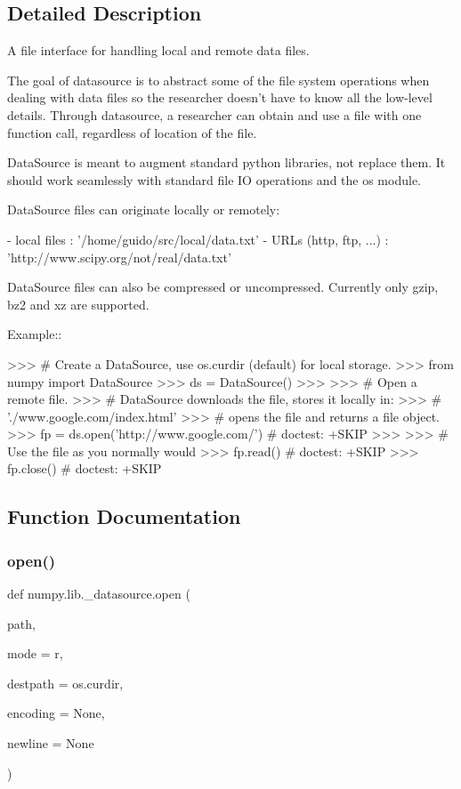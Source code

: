 \subsection{Detailed Description}
\begin{DoxyVerb}A file interface for handling local and remote data files.

The goal of datasource is to abstract some of the file system operations
when dealing with data files so the researcher doesn't have to know all the
low-level details.  Through datasource, a researcher can obtain and use a
file with one function call, regardless of location of the file.

DataSource is meant to augment standard python libraries, not replace them.
It should work seamlessly with standard file IO operations and the os
module.

DataSource files can originate locally or remotely:

- local files : '/home/guido/src/local/data.txt'
- URLs (http, ftp, ...) : 'http://www.scipy.org/not/real/data.txt'

DataSource files can also be compressed or uncompressed.  Currently only
gzip, bz2 and xz are supported.

Example::

    >>> # Create a DataSource, use os.curdir (default) for local storage.
    >>> from numpy import DataSource
    >>> ds = DataSource()
    >>>
    >>> # Open a remote file.
    >>> # DataSource downloads the file, stores it locally in:
    >>> #     './www.google.com/index.html'
    >>> # opens the file and returns a file object.
    >>> fp = ds.open('http://www.google.com/') # doctest: +SKIP
    >>>
    >>> # Use the file as you normally would
    >>> fp.read() # doctest: +SKIP
    >>> fp.close() # doctest: +SKIP\end{DoxyVerb}
 

\subsection{Function Documentation}
\mbox{\label{namespacenumpy_1_1lib_1_1__datasource_a31cb95875384c18d75b818588d65d980}} 
\subsubsection{\texorpdfstring{open()}{open()}}
{\footnotesize\ttfamily def numpy.\+lib.\+\_\+datasource.\+open (\begin{DoxyParamCaption}\item[{}]{path,  }\item[{}]{mode = {\ttfamily \textquotesingle{}r\textquotesingle{}},  }\item[{}]{destpath = {\ttfamily os.curdir},  }\item[{}]{encoding = {\ttfamily None},  }\item[{}]{newline = {\ttfamily None} }\end{DoxyParamCaption})}

